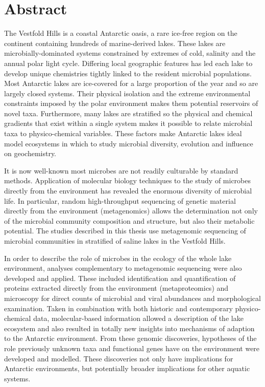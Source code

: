\chapter*{Abstract}

The Vestfold Hills is a coastal Antarctic oasis, a rare ice-free region on the continent containing hundreds of marine-derived lakes.
These lakes are microbially-dominated systems constrained by extremes of cold, salinity and the annual polar light cycle.
Differing local geographic features has led each lake to develop unique chemistries tightly linked to the resident microbial populations.
Most Antarctic lakes are ice-covered for a large proportion of the year and so are largely closed systems.
Their physical isolation and the extreme environmental constraints imposed by the polar environment makes them potential reservoirs of novel taxa.
Furthermore, many lakes are stratified so the physical and chemical gradients that exist within a single system makes it possible to relate microbial taxa to physico-chemical variables.
These factors make Antarctic lakes ideal model ecosystems in which to study microbial diversity, evolution and influence on geochemistry.

It is now well-known most microbes are not readily culturable by standard methods.
Application of molecular biology techniques to the study of microbes directly from the environment has revealed the enormous diversity of microbial life.
In particular, random high-throughput sequencing of genetic material directly from the environment (metagenomics) allows the determination not only of the microbial community composition and structure, but also their metabolic potential.
The studies described in this thesis use metagenomic sequencing of microbial communities in stratified of saline lakes in the Vestfold Hills.

In order to describe the role of microbes in the ecology of the whole lake environment, analyses complementary to metagenomic sequencing were also developed and applied.
These included identification and quantification of proteins extracted directly from the environment (metaproteomics) and microscopy for direct counts of microbial and viral abundances and morphological examination.
Taken in combination with both historic and contemporary physico-chemical data, molecular-based information allowed a description of the lake ecosystem and also resulted in totally new insights into mechanisms of adaption to the Antarctic environment.
From these genomic discoveries, hypotheses of the role previously unknown taxa and functional genes have on the environment were developed and modelled.
These discoveries not only have implications for Antarctic environments, but potentially broader implications for other aquatic systems.





